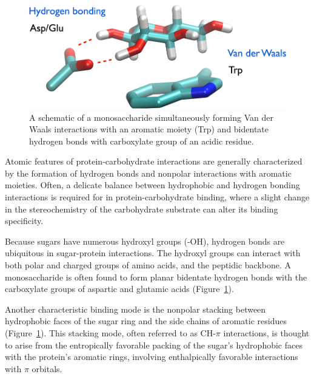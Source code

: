 \begin{figure}
 \centering
 \includegraphics[width=5in]{figures/introduction/sugar_protein_schematic.pdf}
 \caption[A schematic of monosaccharide-protein binding mode]{A schematic of a monosaccharide simultaneously forming Van der Waals interactions with an aromatic moiety (Trp) and bidentate hydrogen bonds with carboxylate group of an acidic residue.}
 \label{fig:sugar_protein_schematic}
\end{figure}

Atomic features of protein-carbohydrate interactions are generally characterized by the formation of hydrogen bonds and nonpolar interactions with aromatic moieties.\cite{Vyas:1991p6498} Often, a delicate balance between hydrophobic and hydrogen bonding interactions is required for in protein-carbohydrate binding, where a slight change in the stereochemistry of the carbohydrate substrate can alter its binding specificity.\cite{Munske:1984ug} %

Because sugars have numerous hydroxyl groups (-OH), hydrogen bonds are ubiquitous in sugar-protein interactions. The hydroxyl groups can interact with both polar and charged groups of amino acids, and the peptidic backbone.  A monosaccharide is often found to form planar bidentate hydrogen bonds with the carboxylate groups of aspartic and glutamic acids (Figure~\ref{fig:sugar_protein_schematic}).  
 
Another characteristic binding mode is the nonpolar stacking between hydrophobic faces of the sugar ring and the side chains of aromatic residues (Figure~\ref{fig:sugar_protein_schematic}).  This stacking mode, often referred to as CH-$\pi$ interactions, is thought to arise from the entropically favorable packing of the sugar's hydrophobic faces with the protein's aromatic rings, involving enthalpically favorable interactions with $\pi$ orbitals.\cite{Laughrey:2008p6566} %

